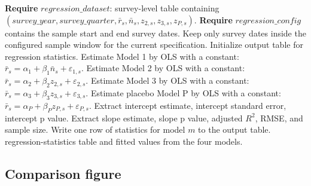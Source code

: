 \documentclass[11pt]{article}
\begin{document}
\begin{algorithm}[H]
\caption{\textsc{RunForecastRevisionRegressions}$(\textit{regression\_dataset}, \textit{regression\_config})$}
\begin{algorithmic}[1]
\State \textbf{Require} $\textit{regression\_dataset}$: survey-level table containing
\Statex \quad $(\textit{survey\_year}, \textit{survey\_quarter}, \bar{r}_s, \bar{n}_s, z_{2,s}, z_{3,s}, z_{P,s})$.
\State \textbf{Require} $\textit{regression\_config}$ contains the sample start and end survey dates.
\State Keep only survey dates inside the configured sample window for the current specification.
\State Initialize output table for regression statistics.
\State Estimate Model 1 by OLS with a constant:
\Statex \quad $\bar{r}_s = \alpha_1 + \beta_1 \bar{n}_s + \varepsilon_{1,s}$.
\State Estimate Model 2 by OLS with a constant:
\Statex \quad $\bar{r}_s = \alpha_2 + \beta_2 z_{2,s} + \varepsilon_{2,s}$.
\State Estimate Model 3 by OLS with a constant:
\Statex \quad $\bar{r}_s = \alpha_3 + \beta_3 z_{3,s} + \varepsilon_{3,s}$.
\State Estimate placebo Model P by OLS with a constant:
\Statex \quad $\bar{r}_s = \alpha_P + \beta_P z_{P,s} + \varepsilon_{P,s}$.
    \State Extract intercept estimate, intercept standard error, intercept p value.
    \State Extract slope estimate, slope p value, adjusted $R^2$, RMSE, and sample size.
    \State Write one row of statistics for model $m$ to the output table.
\EndFor
\State \Return regression-statistics table and fitted values from the four models.
\end{algorithmic}
\end{algorithm}

\subsection{Comparison figure}
\end{document}
